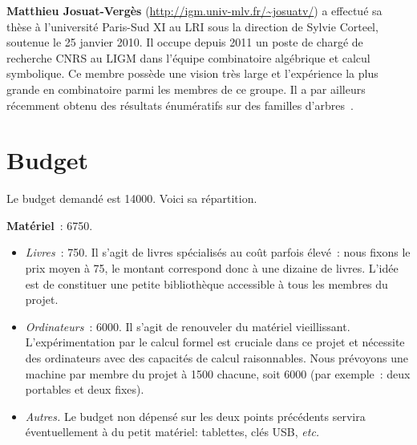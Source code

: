 \documentclass[10pt,reqno]{amsart}
\numberwithin{equation}{subsection}
\begin{document}
{\bf Matthieu Josuat-Vergès} (\url{http://igm.univ-mlv.fr/~josuatv/})
a effectué sa thèse à l'université Paris-Sud XI au LRI sous la
direction de Sylvie Corteel, soutenue le 25 janvier 2010. Il occupe
depuis 2011 un poste de chargé de recherche CNRS au LIGM dans l'équipe
combinatoire algébrique et calcul symbolique. Ce membre possède une
vision très large et l'expérience la plus grande en combinatoire parmi
les membres de ce groupe. Il a par ailleurs récemment obtenu des
résultats énumératifs sur des familles d'arbres~\cite{JV15}. 


\section{Budget}
Le budget demandé est 14000\texteuro. Voici sa répartition.
\smallskip

{\bf Matériel}~: 6750\texteuro.
\begin{itemize}[fullwidth]
    \item {\em Livres}~: 750\texteuro.
    Il s'agit de livres spécialisés au coût parfois élevé~: nous
    fixons le prix moyen à 75\texteuro, le montant correspond donc
    à une dizaine de livres. L'idée est de constituer une petite
    \og bibliothèque \fg{} accessible à tous les membres du projet.

    \item {\em Ordinateurs}~: 6000\texteuro.
    Il s'agit de renouveler du matériel vieillissant.
    L'expérimentation par le calcul formel est cruciale dans ce
    projet et nécessite des ordinateurs avec des capacités de calcul
    raisonnables. Nous prévoyons une machine par membre du projet à
    1500\texteuro{} chacune, soit 6000\texteuro{} (par exemple~:
    deux portables et deux fixes).

    \item {\em Autres.}
    Le budget non dépensé sur les deux points précédents servira
    éventuellement à du petit matériel: tablettes, clés USB, {\em etc.}
\end{itemize}
\smallskip
    
\end{document}
